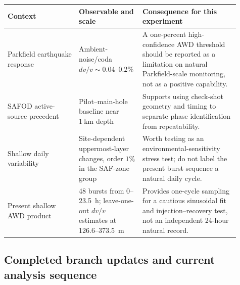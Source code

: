 \documentclass[11pt]{article}
\begin{document}
\begin{center}
\small
\begin{tabular}{p{0.28\linewidth}p{0.25\linewidth}p{0.38\linewidth}}
\toprule
Context & Observable and scale & Consequence for this experiment \\
\midrule
Parkfield earthquake response & Ambient-noise/coda $dv/v\sim0.04$--$0.2\%$ & A one-percent high-confidence AWD threshold should be reported as a limitation on natural Parkfield-scale monitoring, not as a positive capability. \\
SAFOD active-source precedent & Pilot--main-hole baseline near $1~\mathrm{km}$ depth & Supports using check-shot geometry and timing to separate phase identification from repeatability. \\
Shallow daily variability & Site-dependent uppermost-layer changes, order $1\%$ in the SAF-zone group & Worth testing as an environmental-sensitivity stress test; do not label the present burst sequence a natural daily cycle. \\
Present shallow AWD product & 48 bursts from 0--23.5~h; leave-one-out $dv/v$ estimates at 126.6--373.5~m & Provides one-cycle sampling for a cautious sinusoidal fit and injection--recovery test, not an independent 24-hour natural record. \\
\bottomrule
\end{tabular}
\end{center}

\subsection{Completed branch updates and current analysis sequence}
\end{document}
